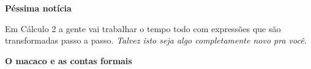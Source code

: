\documentclass[oneside,12pt]{article}
\begin{document}
{{\bsk

{\bf Péssima notícia}

Em Cálculo 2 a gente vai trabalhar o tempo todo com expressões que são
transformadas passo a passo. {\sl Talvez isto seja algo completamente
  novo pra você.}

}}



\newpage

%                                                                       
{\bf O macaco e as contas formais}
\end{document}

